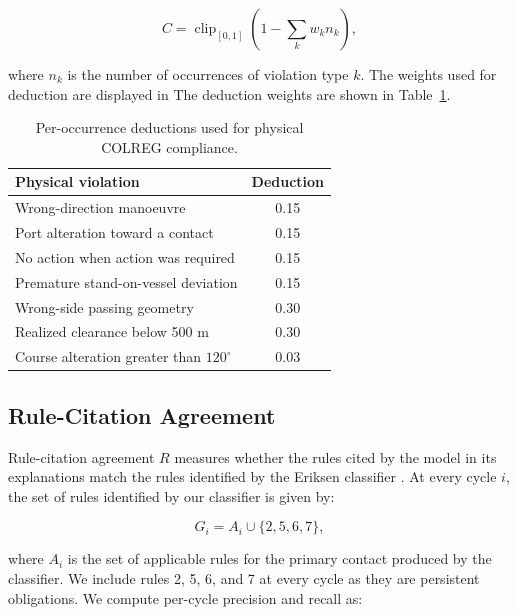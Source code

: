 \documentclass[10pt]{reportMaster}
\begin{document}
\begin{equation}
C =
\operatorname{clip}_{[0,1]}
\left(
1-\sum_k w_k n_k
\right),
\label{eq:physical_compliance}
\end{equation}

where $n_k$ is the number of occurrences of violation type $k$. The weights used for deduction are displayed in The deduction
weights are shown in Table~\ref{tab:physical_compliance_deductions}.

\begin{table}[htbp]
    \centering
    \begin{tabular}{l c}
        \hline
        \textbf{Physical violation} & \textbf{Deduction} \\
        \hline
        Wrong-direction manoeuvre & 0.15 \\
        Port alteration toward a contact & 0.15 \\
        No action when action was required & 0.15 \\
        Premature stand-on-vessel deviation & 0.15 \\
        Wrong-side passing geometry & 0.30 \\
        Realized clearance below 500 m & 0.30 \\
        Course alteration greater than $120^\circ$ & 0.03 \\
        \hline
    \end{tabular}
    \caption{Per-occurrence deductions used for physical COLREG compliance.}
    \label{tab:physical_compliance_deductions}
\end{table}

\subsection{Rule-Citation Agreement}

Rule-citation agreement $R$ measures whether the rules cited by the model in its explanations match the rules identified by the Eriksen classifier \cite{10.3389/frobt.2020.00011}. At every cycle $i$, the set of rules identified by our classifier is given by: 

\begin{equation}
G_i =
A_i \cup \{2,5,6,7\},
\label{eq:expected_rule_set}
\end{equation}

where $A_i$ is the set of applicable rules for the primary contact produced by
the classifier. We include rules 2, 5, 6, and 7 at every cycle as they are persistent obligations. We compute per-cycle precision and recall as:
\end{document}
